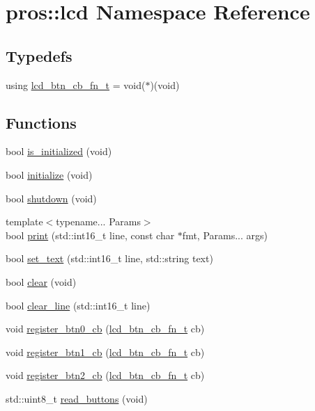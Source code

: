 \hypertarget{namespacepros_1_1lcd}{}\section{pros\+:\+:lcd Namespace Reference}
\label{namespacepros_1_1lcd}
\subsection*{Typedefs}
\begin{DoxyCompactItemize}
\item 
using \hyperlink{namespacepros_1_1lcd_ab5c0cdcf37795ff2a9dcaf546b087dd4}{lcd\+\_\+btn\+\_\+cb\+\_\+fn\+\_\+t} = void($\ast$)(void)
\end{DoxyCompactItemize}
\subsection*{Functions}
\begin{DoxyCompactItemize}
\item 
bool \hyperlink{namespacepros_1_1lcd_a867eb9cd989e1c6c31982fe2b5c58dd9}{is\+\_\+initialized} (void)
\item 
bool \hyperlink{namespacepros_1_1lcd_afb69bfa2fc5da3018b6886f612ed190e}{initialize} (void)
\item 
bool \hyperlink{namespacepros_1_1lcd_a7aa9a422049011de193f54bce8cc95ed}{shutdown} (void)
\item 
{\footnotesize template$<$typename... Params$>$ }\\bool \hyperlink{namespacepros_1_1lcd_aead67d10b420308d58883135f0d28099}{print} (std\+::int16\+\_\+t line, const char $\ast$fmt, Params... args)
\item 
bool \hyperlink{namespacepros_1_1lcd_a515526f1d3069a6aa985512273aa7788}{set\+\_\+text} (std\+::int16\+\_\+t line, std\+::string text)
\item 
bool \hyperlink{namespacepros_1_1lcd_a8d22379bd680a36182d51d8e8ef02baf}{clear} (void)
\item 
bool \hyperlink{namespacepros_1_1lcd_aef44947cea9006f86d4aaa2e32856835}{clear\+\_\+line} (std\+::int16\+\_\+t line)
\item 
void \hyperlink{namespacepros_1_1lcd_a4d8f5121ac67ae7de816334e7b66f08d}{register\+\_\+btn0\+\_\+cb} (\hyperlink{namespacepros_1_1lcd_ab5c0cdcf37795ff2a9dcaf546b087dd4}{lcd\+\_\+btn\+\_\+cb\+\_\+fn\+\_\+t} cb)
\item 
void \hyperlink{namespacepros_1_1lcd_a9a3a9342268b8a95d91190ab36574a0a}{register\+\_\+btn1\+\_\+cb} (\hyperlink{namespacepros_1_1lcd_ab5c0cdcf37795ff2a9dcaf546b087dd4}{lcd\+\_\+btn\+\_\+cb\+\_\+fn\+\_\+t} cb)
\item 
void \hyperlink{namespacepros_1_1lcd_a5b08f4244e366a738668a5c3f700e4be}{register\+\_\+btn2\+\_\+cb} (\hyperlink{namespacepros_1_1lcd_ab5c0cdcf37795ff2a9dcaf546b087dd4}{lcd\+\_\+btn\+\_\+cb\+\_\+fn\+\_\+t} cb)
\item 
std\+::uint8\+\_\+t \hyperlink{namespacepros_1_1lcd_aa6ba655373f3eb0d9ef702337e89f624}{read\+\_\+buttons} (void)
\end{DoxyCompactItemize}


